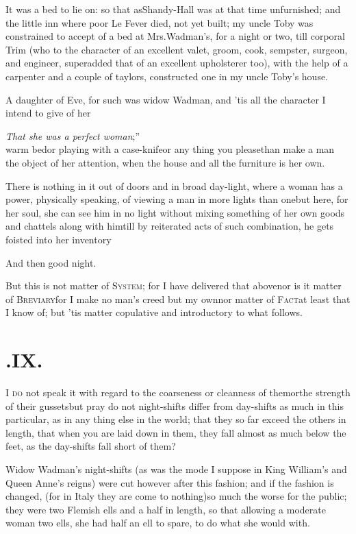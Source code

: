 \documentclass{article}
\begin{document}
\tsh It was a bed to lie on: so that as\break Shandy-Hall was
at that time unfurn\-ish\-ed; and the little inn where poor Le
Fever died, not yet built; my uncle Toby was constrained
to accept of a bed at Mrs.\@ Wadman’s, for a night or
two, till corporal Trim (who to the character of an
excellent valet, groom, cook, sempster, surgeon, and engineer,
superadded that of an excellent upholsterer too), with
the help of a carpenter and a couple of taylors, constructed one in
my uncle Toby’s house.

A daughter of Eve, for such was widow Wadman, and
’tis all the character I intend to give of her\tsk 

\tsk\lqq\textit{That she was a perfect woman};”\\[6pt]
warm bed\tsk or playing with a case-knife\break\tsk or any thing
you please\tsk than make a man the object of her attention,
when\break
the house and all the furniture is her own.

There is nothing in it out of doors and in broad day-light,
where a woman has a power, physically speaking, of viewing a man in
more lights than one\tsk but here, for her soul, she can see him
in no light without mixing something of her own goods and chattels
along with him\tsh till by reiterated acts of such
combination, he gets foisted into her inventory\tsh

\tsh And then good night.

But this is not matter of \textsc{System}; for I have
delivered that above\tsh nor is it matter of
\textsc{Breviary}\tsh for I make no man’s
creed but my own\tsh nor matter of
\textsc{Fact}\tsh at least that I know of; but
’tis matter copulative and introductory to what follows.

\vfill{}\eject
\section{.\enspace IX.}

\lettrine{I}{ do} not speak it with regard to the
coarseness or cleanness of them\tsh or\break the strength of their
gussets\tsh but pray do not night-shifts differ from
day-shifts as much in this particular, as in any thing else in the
world; that they so far exceed the others in length, that when you
are laid down in them, they fall almost as much below the feet, as
the day-shifts fall short of them?

Widow Wadman’s night-shifts (as was the mode I
suppose in King William’s and Queen
Anne’s reigns) were cut however after this fashion;
and if the fashion is changed, (for in Italy they are come to
nothing)\tsh so much the worse for the public; they were two Flemish ells
and a half in length, so that allowing a moderate woman two ells,
she had half an ell to spare, to do what she would with.
\end{document}
